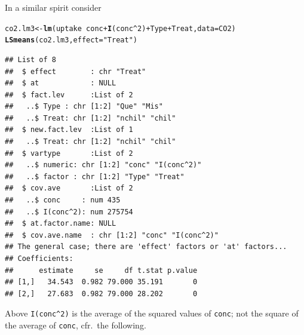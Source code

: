 \documentclass[10pt]{article}\usepackage[]{graphicx}\usepackage[]{color}
\makeatletter
\newcommand{\hlnum}[1]{\textcolor[rgb]{0.686,0.059,0.569}{#1}}%
\newcommand{\hlstr}[1]{\textcolor[rgb]{0.192,0.494,0.8}{#1}}%
\newcommand{\hlopt}[1]{\textcolor[rgb]{0,0,0}{#1}}%
\newcommand{\hlstd}[1]{\textcolor[rgb]{0.345,0.345,0.345}{#1}}%
\newcommand{\hlkwb}[1]{\textcolor[rgb]{0.69,0.353,0.396}{#1}}%
\newcommand{\hlkwc}[1]{\textcolor[rgb]{0.333,0.667,0.333}{#1}}%
\newcommand{\hlkwd}[1]{\textcolor[rgb]{0.737,0.353,0.396}{\textbf{#1}}}%
\newenvironment{kframe}{%
 \def\at@end@of@kframe{}%
 \ifinner\ifhmode%
  \def\at@end@of@kframe{\end{minipage}}%
  \begin{minipage}{\columnwidth}%
 \fi\fi%
 \def\FrameCommand##1{\hskip\@totalleftmargin \hskip-\fboxsep
 \colorbox{shadecolor}{##1}\hskip-\fboxsep
     \hskip-\linewidth \hskip-\@totalleftmargin \hskip\columnwidth}%
 \MakeFramed {\advance\hsize-\width
   \@totalleftmargin\z@ \linewidth\hsize
   \@setminipage}}%
 {\par\unskip\endMakeFramed%
 \at@end@of@kframe}
\newenvironment{knitrout}{}{} %
\def\code#1{\texttt{#1}}
\makeatother
\begin{document}
In a similar spirit consider
\begin{knitrout}
\color{fgcolor}\begin{kframe}
\begin{alltt}
\hlstd{co2.lm3} \hlkwb{<-} \hlkwd{lm}\hlstd{(uptake} \hlopt{~} \hlstd{conc} \hlopt{+} \hlkwd{I}\hlstd{(conc}\hlopt{^}\hlnum{2}\hlstd{)} \hlopt{+} \hlstd{Type} \hlopt{+} \hlstd{Treat,} \hlkwc{data}\hlstd{=CO2)}
\hlkwd{LSmeans}\hlstd{(co2.lm3,} \hlkwc{effect}\hlstd{=}\hlstr{"Treat"}\hlstd{)}
\end{alltt}
\begin{verbatim}
## List of 8
##  $ effect        : chr "Treat"
##  $ at            : NULL
##  $ fact.lev      :List of 2
##   ..$ Type : chr [1:2] "Que" "Mis"
##   ..$ Treat: chr [1:2] "nchil" "chil"
##  $ new.fact.lev  :List of 1
##   ..$ Treat: chr [1:2] "nchil" "chil"
##  $ vartype       :List of 2
##   ..$ numeric: chr [1:2] "conc" "I(conc^2)"
##   ..$ factor : chr [1:2] "Type" "Treat"
##  $ cov.ave       :List of 2
##   ..$ conc     : num 435
##   ..$ I(conc^2): num 275754
##  $ at.factor.name: NULL
##  $ cov.ave.name  : chr [1:2] "conc" "I(conc^2)"
## The general case; there are 'effect' factors or 'at' factors...
## Coefficients:
##      estimate     se     df t.stat p.value
## [1,]   34.543  0.982 79.000 35.191       0
## [2,]   27.683  0.982 79.000 28.202       0
\end{verbatim}
\end{kframe}
\end{knitrout}

Above \verb'I(conc^2)' is the average of the squared values of
\code{conc}; not the  square of the average of
\code{conc}, cfr.\ the following.
\end{document}
